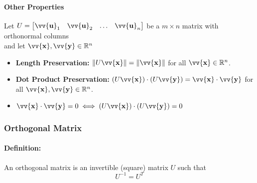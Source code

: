 \documentclass[11pt]{article}
\DeclareRobustCommand{\myvec}[1]{\vv{\mathbf{#1}}}
\newcommand{\mymat}[1]{#1}
\newcommand{\dotprod}[2]{#1 \cdot #2}
\begin{document}
    \paragraph{Other Properties}\mbox{}\vspace{1ex}

    Let $\mymat{U} = \begin{bmatrix} \myvec{u}_1 & \myvec{u}_2 & \dots & \myvec{u}_n \end{bmatrix}$ be a $m \times n$ matrix with orthonormal columns \\
    and let $\myvec{x}, \myvec{y} \in \mathbb{R}^n$
    \begin{itemize}
        \item \textbf{Length Preservation:} $\|\mymat{U}\myvec{x}\| = \|\myvec{x}\|$ for all $\myvec{x} \in \mathbb{R}^n$.
        \item \textbf{Dot Product Preservation:} $(\mymat{U}\myvec{x}) \cdot (\mymat{U}\myvec{y}) = \myvec{x} \cdot \myvec{y}$ for all $\myvec{x}, \myvec{y} \in \mathbb{R}^n$.
        \item $\dotprod{\myvec{x}}{\myvec{y}} = 0 \iff \dotprod{(\mymat{U}\myvec{x})}{(\mymat{U}\myvec{y})} = 0$            
    \end{itemize}
    
    \newpage
    \subsubsection{Orthogonal Matrix}
    \paragraph{Definition: } An orthogonal matrix is an invertible (square) matrix $\mymat{U}$ such that
    \begin{equation}
        \mymat{U}^{-1} = \mymat{U}^T
    \end{equation}
\end{document}
